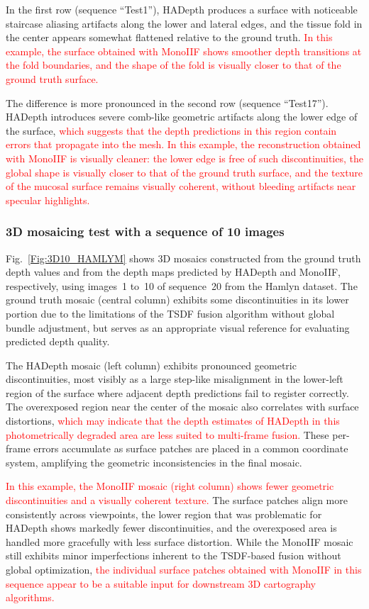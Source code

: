 \documentclass[a4paper,fleqn]{cas-dc}
\begin{document}
In the first row (sequence ``Test1''), HADepth produces a surface with noticeable staircase aliasing artifacts along the lower and lateral edges, and the tissue fold 
in the center appears somewhat flattened relative to the ground truth. \textcolor{red}{In this example, the surface obtained with MonoIIF shows smoother depth transitions at the fold boundaries, and the shape of the fold is visually closer to that of the ground truth surface.}

The difference is more pronounced in the second row (sequence ``Test17''). HADepth introduces severe comb-like geometric artifacts along the lower edge of the surface, \textcolor{red}{which suggests that the depth predictions in this region contain errors that propagate into the mesh. In this example, the reconstruction obtained with MonoIIF is visually cleaner: the lower edge is free of such discontinuities, the global shape is visually closer to that of the ground truth surface, and the texture of the mucosal surface remains visually coherent, without bleeding artifacts near specular highlights.}


\subsubsection*{3D mosaicing test with a sequence of 
10 images}
Fig.~\ref{Fig:3D10_HAMLYM} shows 3D mosaics constructed from the ground truth depth values and from the depth maps predicted by HADepth and MonoIIF, respectively, using images~1 to~10 of sequence~20 from the Hamlyn dataset. The ground truth mosaic (central column) exhibits some discontinuities in its lower portion due to the limitations of the TSDF fusion algorithm without global bundle adjustment, but serves as an appropriate visual reference for evaluating predicted depth quality.

The HADepth mosaic (left column) exhibits pronounced geometric discontinuities, most visibly as a large step-like misalignment in the lower-left region of the surface where adjacent depth predictions fail to register correctly. The overexposed region near the center of the mosaic also correlates with surface distortions, \textcolor{red}{which may indicate that the depth estimates of HADepth in this photometrically degraded area are less suited to multi-frame fusion.} These per-frame errors accumulate as surface patches are placed in a common coordinate system, amplifying the geometric inconsistencies in the final mosaic.

\textcolor{red}{In this example, the MonoIIF mosaic (right column) shows fewer geometric discontinuities and a visually coherent texture.} The surface patches align more consistently across viewpoints, the lower region that was problematic for HADepth shows markedly fewer discontinuities, and the overexposed area is handled more gracefully with less surface distortion. While the MonoIIF mosaic 
still exhibits minor imperfections inherent to the TSDF-based fusion without global optimization, \textcolor{red}{the individual surface patches obtained with MonoIIF in this sequence appear to be a suitable input for downstream 3D cartography algorithms.}
\end{document}
